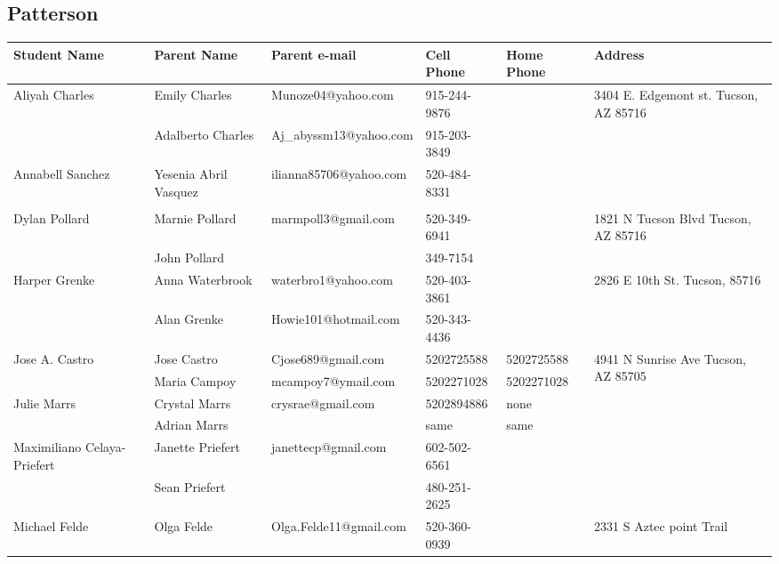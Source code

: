 \documentclass[landscape]{article}\usepackage[]{graphicx}\usepackage[]{color}
\begin{document}
\subsection{Patterson}
\begin{longtable}{|p{100pt}|p{100pt}|p{140pt}|p{60pt}|p{64pt}|p{120pt}|}
\textbf{Student Name} & \textbf{Parent Name} & \textbf{Parent e-mail} & \textbf{Cell Phone} & \textbf{Home Phone} & \textbf{Address}\\
\hline
\hline
\multirow{2}{100pt}{Aliyah Charles} & Emily Charles  & Munoze04@yahoo.com & 915-244-9876 &  & \multirow{2}{120pt}{3404 E. Edgemont st. Tucson, AZ 85716} \\
 & Adalberto Charles & Aj\_abyssm13@yahoo.com & 915-203-3849 &  & \\
\hline
\multirow{2}{100pt}{Annabell Sanchez} & Yesenia Abril Vasquez & ilianna85706@yahoo.com & 520-484-8331 &  & \multirow{2}{120pt}{} \\
 &  &  &  &  & \\
\hline
\multirow{2}{100pt}{Dylan Pollard} & Marnie Pollard & marmpoll3@gmail.com & 520-349-6941 &  & \multirow{2}{120pt}{1821 N Tucson Blvd Tucson, AZ 85716} \\
 & John Pollard &  & 349-7154 &  & \\
\hline
\multirow{2}{100pt}{Harper Grenke} & Anna Waterbrook & waterbro1@yahoo.com & 520-403-3861 &  & \multirow{2}{120pt}{2826 E 10th St. Tucson, 85716} \\
 & Alan Grenke & Howie101@hotmail.com & 520-343-4436 &  & \\
\hline
\multirow{2}{100pt}{Jose A. Castro} & Jose Castro & Cjose689@gmail.com & 5202725588 & 5202725588 & \multirow{2}{120pt}{4941 N Sunrise Ave Tucson, AZ 85705} \\
 & Maria Campoy & mcampoy7@ymail.com & 5202271028 & 5202271028 & \\
\hline
\multirow{2}{100pt}{Julie Marrs} & Crystal Marrs & crysrae@gmail.com & 5202894886 & none & \multirow{2}{120pt}{} \\
 & Adrian Marrs &  & same & same & \\
\hline
\multirow{2}{100pt}{Maximiliano Celaya-Priefert} & Janette Priefert & janettecp@gmail.com & 602-502-6561 &  & \multirow{2}{120pt}{} \\
 & Sean Priefert &  & 480-251-2625 &  & \\
\hline
\multirow{2}{100pt}{Michael Felde} & Olga Felde & Olga.Felde11@gmail.com & 520-360-0939 &  & \multirow{2}{120pt}{2331 S Aztec point Trail} \\

\end{longtable}
\end{document}
